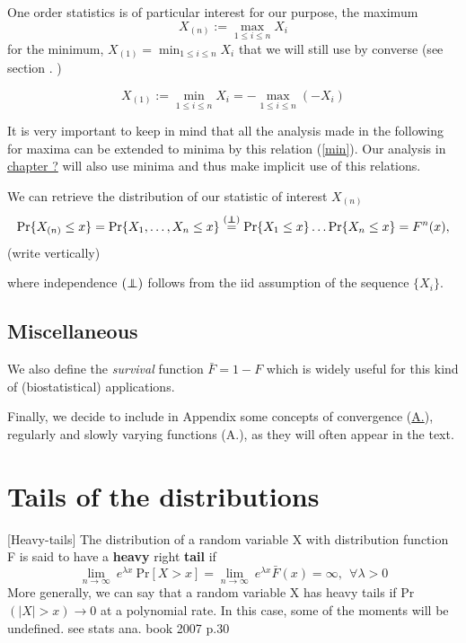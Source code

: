 \documentclass[11pt,a4paper,openany ]{book}
\newcommand\independent{\protect\mathpalette{\protect\independenT}{\perp}}
\def\independenT#1#2{\mathrel{\rlap{$#1#2$}\mkern2mu{#1#2}}}
\begin{document}
One order statistics is of particular interest for our purpose, the maximum
\begin{equation} \label{max}
X_{(n)}:=\displaystyle{\max_{1\leq i\leq n}}X_i
\end{equation}  for the minimum, $X_{(1)}=\displaystyle{\min_{1\leq i\leq n}}X_i$ that we will still use by converse (see section . )

\begin{equation}\label{min}
X_{(1)}:=\displaystyle{\min_{1\leq i\leq n}}X_i=- \displaystyle{\max_{1\leq i\leq n}}(-X_i)
\end{equation}

It is very important to keep in mind that all the analysis made in the following for maxima 
can be extended to minima by this relation (\ref{min}). Our analysis in \hyperref[]{chapter 
	?} will also use minima and thus make implicit use of this relations.

We can retrieve the distribution of our statistic of interest $X_{(n)}$
\begin{equation}\label{maxdist}
\text{Pr}\{X_{(n)}\leq x\}=\text{Pr}\{X_1,\dots,X_n\leq x\}\stackrel{(\independent)}{=}\text{Pr}\{X_1\leq x\}\dots\text{Pr}\{X_n\leq x\}=F^n(x),
\end{equation}
(write vertically)

where independence $(\independent)$  follows from the iid assumption of the sequence $\{X_i\}$.


\subsection*{Miscellaneous}

We also define the \textit{survival} function $\bar{F}=1-F$ which is widely useful for this kind of (biostatistical) applications.

Finally, we decide to include in Appendix some concepts of convergence 
(\hyperref[appA]{A.}), regularly and slowly varying functions (A.), as they will often 
appear in the text.


\section{Tails of the distributions}

[Heavy-tails] The distribution of a random variable X with distribution function F is said 
to have a \textbf{heavy} right \textbf{tail} if 
\begin{equation}
\displaystyle{\lim_{n \to \infty}} \ e^{\lambda x} \ \text{Pr}[X>x]=\displaystyle{\lim_{n 
\to \infty}} \ e^{\lambda x} \bar{F}(x)=\infty , \ \ \forall \lambda>0
\end{equation}
More generally, we can say that a random variable X has heavy tails if Pr$(|X|>x)\to 0$ at 
a polynomial rate. In this case, some of the moments will be undefined. see stats ana. book 
2007 p.30
\end{document}

